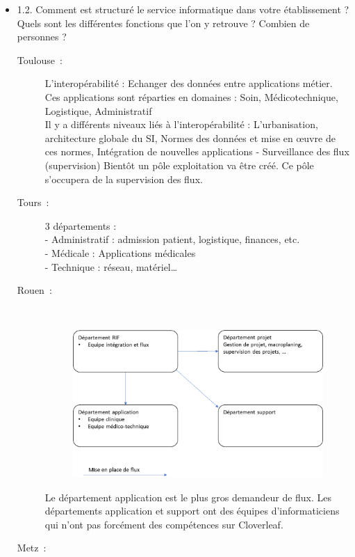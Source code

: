 \begin{itemize}
	  \item 1.2. Comment est structuré le service informatique dans votre
	  établissement ? Quels sont les différentes fonctions que l’on y retrouve ? Combien de personnes ?
	  \begin{description}
	  	\item[Toulouse~:] L’interopérabilité : Echanger des données entre
	  	applications métier. Ces applications sont réparties en domaines : Soin,
	  	Médicotechnique, Logistique, Administratif\\
		Il y a différents niveaux liés à l’interopérabilité : L’urbanisation,
		architecture globale du SI, Normes des données et mise en œuvre de ces normes,
		Intégration de nouvelles applications -	Surveillance des flux (supervision)
		Bientôt un pôle exploitation va être créé. Ce pôle s’occupera de la
		supervision des flux.
	  	\item[Tours~:] 3 départements : \\
		-	Administratif : admission patient, logistique, finances, etc.\\
		-	Médicale : Applications médicales\\
		-	Technique : réseau, matériel…
	  	\item[Rouen~:]\\
	  	\begin{figure}[H]
			\centering
			\includegraphics[width=15cm]{../img/annexes/orga_rouen.png}
		\end{figure}
		Le département application est le plus gros demandeur de flux. Les
		départements application et support ont des équipes d’informaticiens qui
		n’ont pas forcément des compétences sur Cloverleaf.
	  	\item[Metz~:]\\
	  	\begin{figure}[H]

\end{figure}
\end{description}
\end{itemize}
